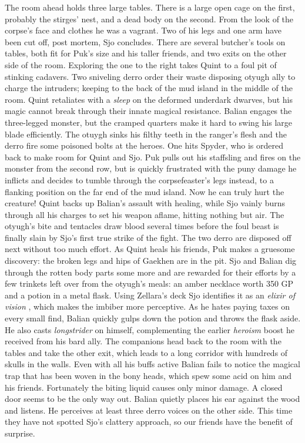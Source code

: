 The room ahead holds three large tables. There is a large open cage on the first, probably the stirges' nest, and a dead body on the second. From the look of the corpse's face and clothes he was a vagrant. Two of his legs and one arm have been cut off, post mortem, Sjo concludes. There are several butcher's tools on tables, both fit for Puk's size and his taller friends, and two exits on the other side of the room. Exploring the one to the right takes Quint to a foul pit of stinking cadavers. Two sniveling derro order their waste disposing otyugh ally to charge the intruders; keeping to the back of the mud island in the middle of the room. Quint retaliates with a {\itshape sleep} on the deformed underdark dwarves, but his magic cannot break through their innate magical resistance. Balian engages the three-legged monster, but the cramped quarters make it hard to swing his large blade efficiently. The otuygh sinks his filthy teeth in the ranger's flesh and the derro fire some poisoned bolts at the heroes. One hits Spyder, who is ordered back to make room for Quint and Sjo. Puk pulls out his staffsling and fires on the monster from the second row, but is quickly frustrated with the puny damage he inflicts and decides to tumble through the corpsefeaster's legs instead, to a flanking position on the far end of the mud island. Now he can truly hurt the creature! Quint backs up Balian's assault with healing, while Sjo vainly burns through all his charges to set his weapon aflame, hitting nothing but air. The otyugh's bite and tentacles draw blood several times before the foul beast is finally slain by Sjo's first true strike of the fight. The two derro are disposed off next without too much effort. As Quint heals his friends, Puk makes a gruesome discovery: the broken legs and hips of Gaekhen are in the pit. Sjo and Balian dig through the rotten body parts some more and are rewarded for their efforts by a few trinkets left over from the otyugh's meals: an amber necklace worth 350 GP and a potion in a metal flask. Using Zellara's deck Sjo identifies it as an  {\itshape elixir of vision} , which makes the imbiber more perceptive. As he hates paying taxes on every small find, Balian quickly gulps down the potion and throws the flask aside. He also casts  {\itshape longstrider} on himself, complementing the earlier  {\itshape heroism} boost he received from his bard ally. The companions head back to the room with the tables and take the other exit, which leads to a long corridor with hundreds of skulls in the walls. Even with all his buffs active Balian fails to notice the magical trap that has been woven in the bony heads, which spew some acid on him and his friends. Fortunately the biting liquid causes only minor damage. A closed door seems to be the only way out. Balian quietly places his ear against the wood and listens. He perceives at least three derro voices on the other side. This time they have not spotted Sjo's clattery approach, so our friends have the benefit of surprise.\\

